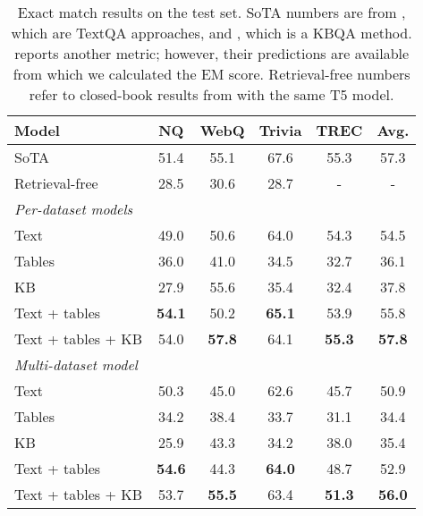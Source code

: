 \documentclass[11pt]{article}
\begin{document}
\begin{table*}[t]
\centering

\begin{tabular}{l@{\hskip 3em}ccccc}
 \toprule
 Model  & \textbf{NQ}  & \textbf{WebQ} & \textbf{Trivia} & \textbf{TREC} & \textbf{Avg.} \\
\midrule
SoTA & 51.4 & 55.1 & 67.6 & 55.3 & 57.3 \\
Retrieval-free & 28.5 & 30.6 & 28.7 & - & - \\
\midrule
\multicolumn{1}{l}{\textit{Per-dataset models}} & \multicolumn{4}{l}{} \\
Text & 49.0 & 50.6 & 64.0 & 54.3 & 54.5  \\
Tables & 36.0 & 41.0 & 34.5 & 32.7 & 36.1  \\
KB & 27.9 & 55.6 & 35.4 & 32.4 & 37.8  \\
Text + tables & \textbf{54.1} & 50.2 & \textbf{65.1} & 53.9 & 55.8  \\
Text + tables + KB & 54.0 & \textbf{57.8} & 64.1 & \textbf{55.3} & \textbf{57.8}  \\
\midrule
\multicolumn{1}{l}{\textit{Multi-dataset model}} & \multicolumn{4}{l}{} \\
Text & 50.3 & 45.0 & 62.6 & 45.7 & 50.9  \\
Tables & 34.2 & 38.4 & 33.7 & 31.1 & 34.4  \\
KB & 25.9 & 43.3 & 34.2 & 38.0 & 35.4  \\
Text + tables & \textbf{54.6} & 44.3 & \textbf{64.0} & 48.7 & 52.9  \\
Text + tables + KB & 53.7 & \textbf{55.5} & 63.4 & \textbf{51.3} & \textbf{56.0}  \\
\bottomrule
\end{tabular}
\caption{Exact match results on the test set.  SoTA numbers are from \citep{izacard-grave-2021-leveraging}, \citep{iyer-etal-2021-reconsider} which are TextQA approaches,  and \cite{jain-2016-question}, which is a KBQA method. \cite{jain-2016-question} reports another metric; however, their predictions are available from which we calculated the EM score. Retrieval-free numbers refer to closed-book results from \citet{t5close} with the same T5 model.}
\label{tab:main}
\vspace{-3mm}
\end{table*}
\end{document}
